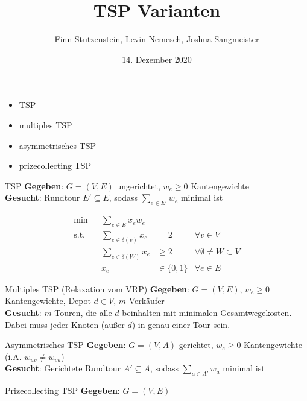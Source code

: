 \documentclass[ngerman,aspectratio=169,10pt]{beamer}
\title{TSP Varianten}
\date{14. Dezember 2020}
\author{Finn Stutzenstein, Levin Nemesch, Joshua Sangmeister}
\institute{Algorithm Engineering - Übung 3}
\begin{document}
\maketitle

\begin{frame}
	\begin{itemize}
		\item TSP
		\item multiples TSP
		\item asymmetrisches TSP
		\item prizecollecting TSP
	\end{itemize}
\end{frame}

\begin{frame}{TSP}
	\textbf{Gegeben}: $G=(V,E)$ ungerichtet, $w_e\geq0$ Kantengewichte\\
	\textbf{Gesucht}: Rundtour $E'\subseteq E$, sodass $\sum_{e\in E'}w_e$ minimal ist
	
	\begin{align*}
	\min && \sum_{e\in E}x_ew_e&&\\
	\text{s.t.} && \sum_{e\in \delta(v)}x_e &=2 &\forall v\in V\\
	&& \sum_{e\in \delta(W)}x_e &\geq2 &\forall \emptyset\neq W\subset V\\
	&& x_e &\in\{0,1\} &\forall e\in E
	\end{align*}
\end{frame}

\begin{frame}{Multiples TSP (Relaxation vom VRP)}
	\textbf{Gegeben}: $G=(V,E)$, $w_e\geq0$ Kantengewichte, Depot $d\in V$, $m$ Verkäufer\\
	\textbf{Gesucht}: $m$ Touren, die alle $d$ beinhalten mit minimalen Gesamtwegekosten. Dabei muss jeder Knoten (außer $d$) in genau einer Tour sein.
\end{frame}

\begin{frame}{Asymmetrisches TSP}
	\textbf{Gegeben}: $G=(V,A)$ gerichtet, $w_e\geq0$ Kantengewichte (i.A. $w_{uv}\neq w_{vu}$)\\
	\textbf{Gesucht}: Gerichtete Rundtour $A'\subseteq A$, sodass $\sum_{a\in A'}w_a$ minimal ist
\end{frame}

\begin{frame}{Prizecollecting TSP}
	\textbf{Gegeben}: $G=(V,E)$
\end{frame}
\end{document}
